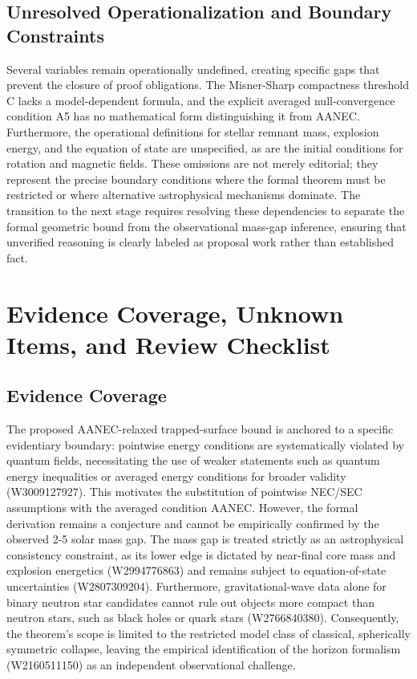 \documentclass[conference]{IEEEtran}
\begin{document}
\subsection{Unresolved Operationalization and Boundary Constraints}
Several variables remain operationally undefined, creating specific gaps that prevent the closure of proof obligations. The Misner-Sharp compactness threshold C lacks a model-dependent formula, and the explicit averaged null-convergence condition A5 has no mathematical form distinguishing it from AANEC. Furthermore, the operational definitions for stellar remnant mass, explosion energy, and the equation of state are unspecified, as are the initial conditions for rotation and magnetic fields. These omissions are not merely editorial; they represent the precise boundary conditions where the formal theorem must be restricted or where alternative astrophysical mechanisms dominate. The transition to the next stage requires resolving these dependencies to separate the formal geometric bound from the observational mass-gap inference, ensuring that unverified reasoning is clearly labeled as proposal work rather than established fact.

\section{Evidence Coverage, Unknown Items, and Review Checklist}
\subsection{Evidence Coverage}
The proposed AANEC-relaxed trapped-surface bound is anchored to a specific evidentiary boundary: pointwise energy conditions are systematically violated by quantum fields, necessitating the use of weaker statements such as quantum energy inequalities or averaged energy conditions for broader validity (W3009127927). This motivates the substitution of pointwise NEC/SEC assumptions with the averaged condition AANEC. However, the formal derivation remains a conjecture and cannot be empirically confirmed by the observed 2-5 solar mass gap. The mass gap is treated strictly as an astrophysical consistency constraint, as its lower edge is dictated by near-final core mass and explosion energetics (W2994776863) and remains subject to equation-of-state uncertainties (W2807309204). Furthermore, gravitational-wave data alone for binary neutron star candidates cannot rule out objects more compact than neutron stars, such as black holes or quark stars (W2766840380). Consequently, the theorem's scope is limited to the restricted model class of classical, spherically symmetric collapse, leaving the empirical identification of the horizon formalism (W2160511150) as an independent observational challenge.~\cite{cite_0ed84243cf171bc4,cite_7a407c865faafd11,cite_37ecbded9d629353}
\end{document}
